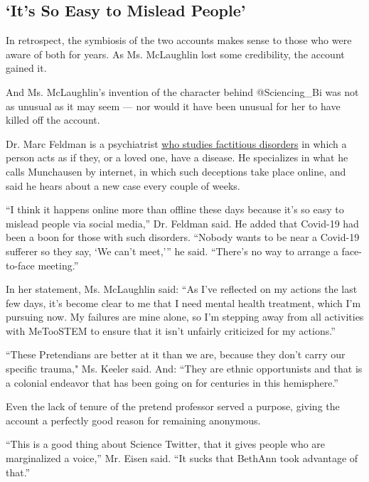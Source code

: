 \hypertarget{its-so-easy-to-mislead-people}{%
\subsection{`It's So Easy to Mislead
People'}\label{its-so-easy-to-mislead-people}}

In retrospect, the symbiosis of the two accounts makes sense to those
who were aware of both for years. As Ms. McLaughlin lost some
credibility, the account gained it.

And Ms. McLaughlin's invention of the character behind @Sciencing\_Bi
was not as unusual as it may seem --- nor would it have been unusual for
her to have killed off the account.

Dr. Marc Feldman is a psychiatrist
\href{https://www.nytimes.com/1999/07/20/science/a-great-pretender-now-faces-the-truth-of-illness.html}{who
studies factitious disorders} in which a person acts as if they, or a
loved one, have a disease. He specializes in what he calls Munchausen by
internet, in which such deceptions take place online, and said he hears
about a new case every couple of weeks.

``I think it happens online more than offline these days because it's so
easy to mislead people via social media,'' Dr. Feldman said. He added
that Covid-19 had been a boon for those with such disorders. ``Nobody
wants to be near a Covid-19 sufferer so they say, `We can't meet,''' he
said. ``There's no way to arrange a face-to-face meeting.''

In her statement, Ms. McLaughlin said: ``As I've reflected on my actions
the last few days, it's become clear to me that I need mental health
treatment, which I'm pursuing now. My failures are mine alone, so I'm
stepping away from all activities with MeTooSTEM to ensure that it isn't
unfairly criticized for my actions.''

``These Pretendians are better at it than we are, because they don't
carry our specific trauma," Ms. Keeler said. And: ``They are ethnic
opportunists and that is a colonial endeavor that has been going on for
centuries in this hemisphere.''

Even the lack of tenure of the pretend professor served a purpose,
giving the account a perfectly good reason for remaining anonymous.

``This is a good thing about Science Twitter, that it gives people who
are marginalized a voice,'' Mr. Eisen said. ``It sucks that BethAnn took
advantage of that.''

